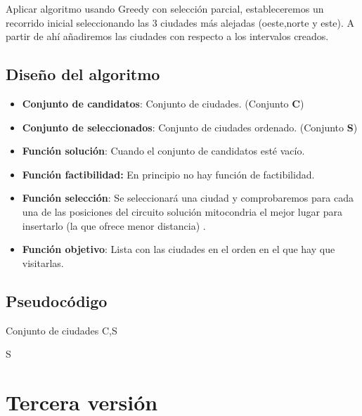 		Aplicar algoritmo usando Greedy con selección parcial, estableceremos un recorrido inicial seleccionando las 3 ciudades más alejadas (oeste,norte y este). A partir de ahí añadiremos las ciudades con respecto a los intervalos creados.
		

	
	\subsection{Diseño del algoritmo} 
	
		\begin{itemize}
			\item \textbf{Conjunto de candidatos}: Conjunto de ciudades. (Conjunto \textbf{C})
			\item \textbf{Conjunto de seleccionados}: Conjunto de ciudades ordenado. (Conjunto \textbf{S})
			\item \textbf{Función solución}: Cuando el conjunto de candidatos esté vacío.
			\item \textbf{Función factibilidad:} En principio no hay función de factibilidad.
			\item \textbf{Función selección}: Se seleccionará una ciudad y comprobaremos para cada una de las posiciones del circuito solución mitocondria el mejor lugar para insertarlo (la que ofrece menor distancia) .
			\item \textbf{Función objetivo}: Lista con las ciudades en el orden en el que hay que visitarlas.		
		\end{itemize}
		
	
	
	\subsection{Pseudocódigo}
			\begin{algorithmic}				
			\Require Conjunto de ciudades C,S
			\EndFor
			\EndFor  
			
			\Return S	
			
			
			
		\end{algorithmic}
		
		
	
	
	
	\section{Tercera versión} 
	
